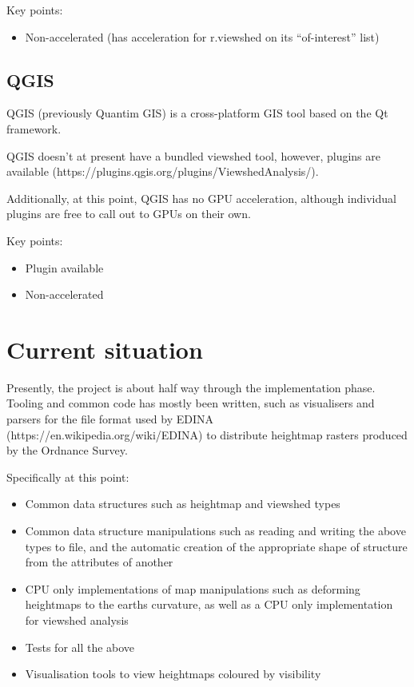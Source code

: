 \documentclass[a4paper]{article}
\begin{document}
        Key points:
        \begin{itemize}
            \item Non-accelerated (has acceleration for r.viewshed on its ``of-interest'' list)
        \end{itemize}

        \subsection{QGIS}
        QGIS (previously Quantim GIS) is a cross-platform GIS tool based on the Qt framework.

        QGIS doesn't at present have a bundled viewshed tool, however, plugins are available
        (https://plugins.qgis.org/plugins/ViewshedAnalysis/).

        Additionally, at this point, QGIS has no GPU acceleration, although individual plugins are free to call out to
        GPUs on their own.

        Key points:
        \begin{itemize}
            \item Plugin available
            \item Non-accelerated
        \end{itemize}

    \section{Current situation}
    Presently, the project is about half way through the implementation phase. Tooling and common code has mostly been
    written, such as visualisers and parsers for the file format used by EDINA (https://en.wikipedia.org/wiki/EDINA) to
    distribute heightmap rasters produced by the Ordnance Survey.

    Specifically at this point:
    \begin{itemize}
        \item Common data structures such as heightmap and viewshed types
        \item Common data structure manipulations such as reading and writing the above types to file, and the
            automatic creation of the appropriate shape of structure from the attributes of another
        \item CPU only implementations of map manipulations such as deforming heightmaps to the earths curvature, as
            well as a CPU only implementation for viewshed analysis
        \item Tests for all the above
        \item Visualisation tools to view heightmaps coloured by visibility
    \end{itemize}
\end{document}
